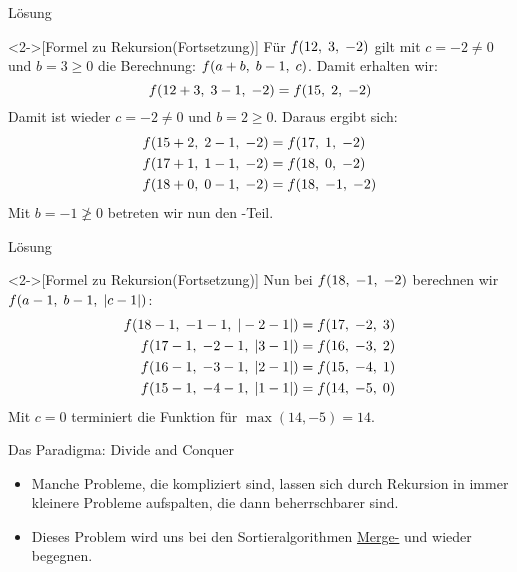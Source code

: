 \begin{frame}[c]{Lösung}
    \addtocounter{solve}{-1}%
    \begin{solve}<2->[Formel zu Rekursion\hfill(Fortsetzung)]
        \pause{}\pause{}Für \(\f(12, 3, -2)\) gilt mit \(c = -2 \neq 0\) und \(b = 3 \geq 0\) die Berechnung: \(\f(a + b, b - 1, c)\). Damit erhalten wir:\pause{}
\begin{equation*}
    \f(12 + 3, 3 - 1, -2) = \f(15, 2, -2)
\end{equation*}
        \pause{}Damit ist wieder  \(c = -2 \neq 0\) und \(b = 2 \geq 0\). Daraus ergibt sich:\pause{}
\begin{align*}
    \f(15 + 2, 2 - 1, -2) & = \f(17, 1, -2)\\
    \f(17 + 1, 1 - 1, -2) &= \f(18, 0, -2)\\
    \f(18 + 0, 0 - 1, -2) &= \f(18, -1, -2)
\end{align*}
        \pause{}Mit \(b = -1 \not\geq 0\) betreten wir nun den -Teil.
    \end{solve}
\end{frame}

\begin{frame}[c]{Lösung}
    \addtocounter{solve}{-1}%
    \begin{solve}<2->[Formel zu Rekursion\hfill(Fortsetzung)]
        \pause{}\pause{}Nun bei \(\f(18, -1, -2)\) berechnen wir \(\f(a - 1, b -1, |c - 1|)\):\pause{}
\begin{align*}
    \f(18 - 1, -1 - 1, |-2 - 1 |) &= \f(17, -2, 3) \\
    \f(17 - 1, -2 - 1, |3 - 1 |) &= \f(16, -3, 2) \\
    \f(16 - 1, -3 - 1, |2 - 1 |) &= \f(15, -4, 1) \\
    \f(15 - 1, -4 - 1, |1 - 1 |) &= \f(14, -5, 0)
\end{align*}
    \pause{}Mit \(c = 0\) terminiert die Funktion für \(\max(14, -5) = 14\).
    \end{solve}
\end{frame}
\endgroup
\fi

\begin{frame}{Das Paradigma: Divide and Conquer}
    \begin{itemize}[<+(1)->]
        \widei
        \item Manche Probleme, die kompliziert sind,\pause{} lassen sich durch Rekursion in immer kleinere Probleme aufspalten, die dann beherrschbarer sind.
        \item Dieses Problem wird uns bei den Sortieralgorithmen \hyperlink{mrk:sort-Mergesort}{Merge-} und  wieder begegnen.
    \end{itemize}
\end{frame}

